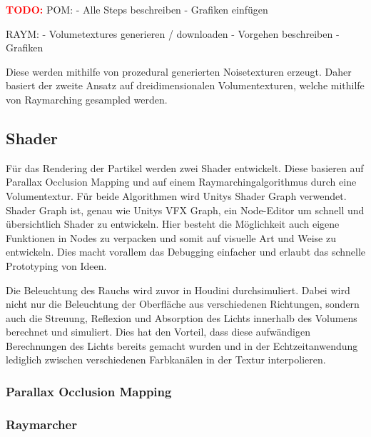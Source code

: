 \newpage
\textcolor{red}{\textbf{TODO:}} \newline
POM: \newline
- Alle Steps beschreiben\newline
- Grafiken einfügen\newline

RAYM: \newline
- Volumetextures generieren / downloaden\newline
- Vorgehen beschreiben\newline
- Grafiken \newline

Diese werden mithilfe von prozedural generierten Noisetexturen erzeugt.
Daher basiert der zweite Ansatz auf dreidimensionalen Volumentexturen, welche mithilfe von Raymarching gesampled werden.


\subsection{Shader}
Für das Rendering der Partikel werden zwei Shader entwickelt. Diese basieren auf Parallax Occlusion Mapping und auf einem Raymarchingalgorithmus
durch eine Volumentextur. Für beide Algorithmen wird Unitys Shader Graph verwendet. Shader Graph ist, genau wie Unitys VFX Graph, ein Node-Editor um
schnell und übersichtlich Shader zu entwickeln. Hier besteht die Möglichkeit auch eigene Funktionen in Nodes zu verpacken und somit auf visuelle Art und Weise zu entwickeln.
Dies macht vorallem das Debugging einfacher und erlaubt das schnelle Prototyping von Ideen.

Die Beleuchtung des Rauchs wird zuvor in Houdini durchsimuliert. Dabei wird nicht nur die Beleuchtung der Oberfläche aus verschiedenen Richtungen, 
sondern auch die Streuung, Reflexion und Absorption des Lichts innerhalb des Volumens berechnet und simuliert. 
Dies hat den Vorteil, dass diese aufwändigen Berechnungen des Lichts bereits gemacht wurden und in der Echtzeitanwendung lediglich zwischen verschiedenen 
Farbkanälen in der Textur interpolieren.


\subsubsection{Parallax Occlusion Mapping}


\subsubsection{Raymarcher}

